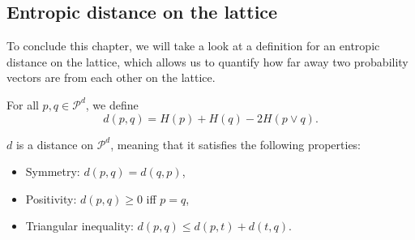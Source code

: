 \subsection{Entropic distance on the lattice}

To conclude this chapter, we will take a look at a definition for an entropic distance on the lattice, which allows us to quantify how far away two probability vectors are from each other on the lattice.

\begin{definition}
    For all $p, q \in \mathcal{P}^d$, we define
    \begin{equation}
        d(p, q) = H(p) + H(q) - 2H(p \vee q).
    \end{equation}
\end{definition}

\begin{theorem}
    $d$ is a distance on $\mathcal{P}^d$, meaning that it satisfies the following properties:
    \begin{itemize}
        \item Symmetry: $d(p, q) = d(q, p)$,
        \item Positivity: $d(p, q) \geq 0$  iff $p = q$,
        \item Triangular inequality: $d(p, q) \leq d(p, t) + d(t, q)$.
    \end{itemize}
\end{theorem}